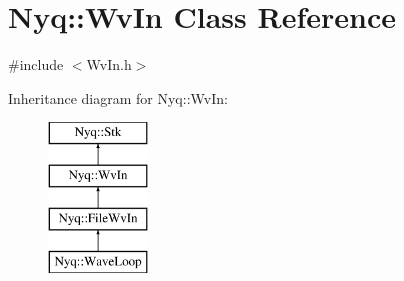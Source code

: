\hypertarget{class_nyq_1_1_wv_in}{}\section{Nyq\+:\+:Wv\+In Class Reference}
\label{class_nyq_1_1_wv_in}


{\ttfamily \#include $<$Wv\+In.\+h$>$}

Inheritance diagram for Nyq\+:\+:Wv\+In\+:\begin{figure}[H]
\begin{center}
\leavevmode
\includegraphics[height=4.000000cm]{class_nyq_1_1_wv_in}
\end{center}
\end{figure}
